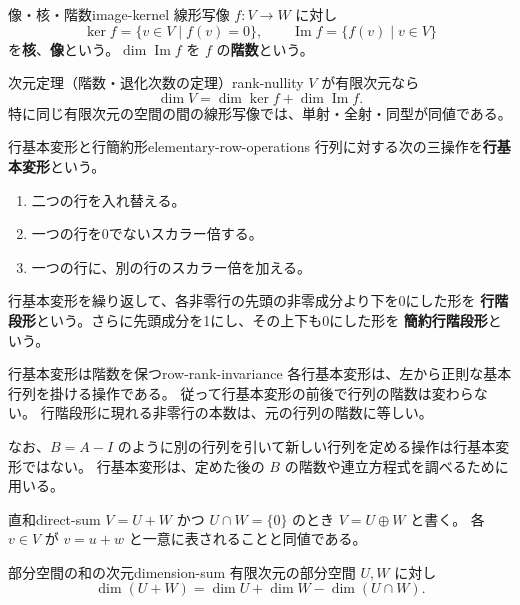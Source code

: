 \begin{definition}{像・核・階数}{image-kernel}
線形写像 $f:V\to W$ に対し
\[
  \ker f=\{v\in V\mid f(v)=0\},\qquad
  \operatorname{Im}f=\{f(v)\mid v\in V\}
\]
を\textbf{核}、\textbf{像}という。$\dim\operatorname{Im}f$ を $f$ の\textbf{階数}という。
\end{definition}

\begin{theorem}{次元定理（階数・退化次数の定理）}{rank-nullity}
$V$ が有限次元なら
\[
  \dim V=\dim\ker f+\dim\operatorname{Im}f.
\]
特に同じ有限次元の空間の間の線形写像では、単射・全射・同型が同値である。
\end{theorem}

\begin{definition}{行基本変形と行簡約形}{elementary-row-operations}
行列に対する次の三操作を\textbf{行基本変形}という。
\begin{enumerate}
  \item 二つの行を入れ替える。
  \item 一つの行を0でないスカラー倍する。
  \item 一つの行に、別の行のスカラー倍を加える。
\end{enumerate}
行基本変形を繰り返して、各非零行の先頭の非零成分より下を0にした形を
\textbf{行階段形}という。さらに先頭成分を1にし、その上下も0にした形を
\textbf{簡約行階段形}という。
\end{definition}

\begin{proposition}{行基本変形は階数を保つ}{row-rank-invariance}
各行基本変形は、左から正則な基本行列を掛ける操作である。
従って行基本変形の前後で行列の階数は変わらない。
行階段形に現れる非零行の本数は、元の行列の階数に等しい。

なお、$B=A-I$ のように別の行列を引いて新しい行列を定める操作は行基本変形ではない。
行基本変形は、定めた後の $B$ の階数や連立方程式を調べるために用いる。
\end{proposition}

\begin{definition}{直和}{direct-sum}
$V=U+W$ かつ $U\cap W=\{0\}$ のとき $V=U\oplus W$ と書く。
各 $v\in V$ が $v=u+w$ と一意に表されることと同値である。
\end{definition}

\begin{proposition}{部分空間の和の次元}{dimension-sum}
有限次元の部分空間 $U,W$ に対し
\[
  \dim(U+W)=\dim U+\dim W-\dim(U\cap W).
\]
\end{proposition}

